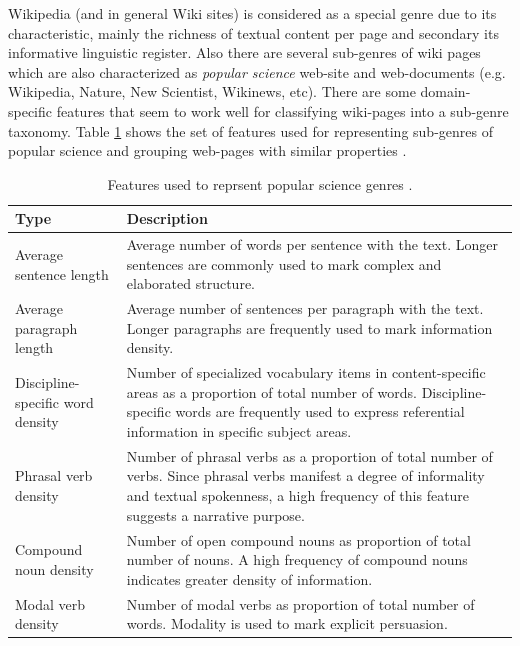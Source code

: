 Wikipedia (and in general Wiki sites) is considered as a special genre due to its characteristic, mainly the richness of textual content per page and secondary its informative linguistic register. Also there are several sub-genres of wiki pages which are also characterized as \textit{popular science} web-site and web-documents (e.g. Wikipedia, Nature, New Scientist, Wikinews, etc). There are some domain-specific features that seem to work well for classifying wiki-pages into a sub-genre taxonomy. Table \ref{chap:relevant_work:tbl:pop_science_features} shows the set of features used for representing sub-genres of popular science and grouping web-pages with similar properties \parencite{lieungnapar2017genre}. 

\begin{table}[t]
	\center
	\caption {Features used to reprsent popular science genres \parencite{lieungnapar2017genre}.}\label{chap:relevant_work:tbl:pop_science_features}
	\begin{tabular}{p{2cm}p{12cm}}
		\hline
		Type & Description \\
		\hline
		Average sentence length & Average number of words per sentence with the text. Longer sentences are commonly used to mark complex and elaborated structure. \\
        \hline
        Average paragraph length & Average number of sentences per paragraph with the text. Longer paragraphs are frequently used to mark information density. \\
        \hline
        Discipline-specific word density & Number of specialized vocabulary items in content-specific areas as a proportion of total number of words. Discipline-specific words are frequently used to express referential information in specific subject areas. \\
        \hline
        Phrasal verb density & Number of phrasal verbs as a proportion of total number of verbs. Since phrasal verbs manifest a degree of informality and textual spokenness, a high frequency of this feature suggests a narrative purpose. \\
        \hline
        Compound noun density & Number of open compound nouns as proportion of total number of nouns. A high frequency of compound nouns indicates greater density of information. \\
        \hline
        Modal verb density & Number of modal verbs as proportion of total number of words. Modality is used to mark explicit persuasion.  \\
        \hline

\end{tabular}
\end{table}
